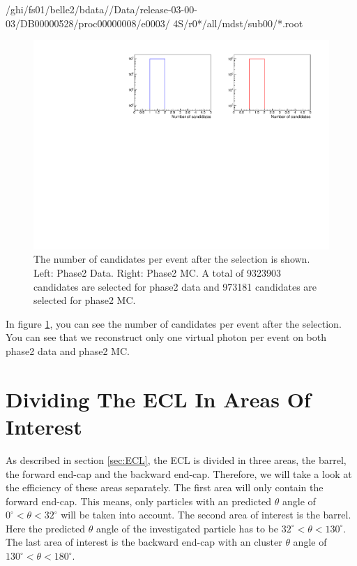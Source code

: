 \documentclass[a4paper,11pt,twosided,final,german,openbib,pdftex,listof=totoc,bibliography=totoc]{scrbook}
\begin{document}
/ghi/fs01/belle2/bdata//Data/release-03-00-03/DB00000528/proc00000008/e0003/ 4S/r0*/all/mdst/sub00/*.root
\newline



\begin{figure}[h!]
	\includegraphics[width=\textwidth]{Plots/master/CCand.pdf}
	\caption[Total Number Of Events After The Selection]{The number of candidates per event after the selection is shown. Left: Phase2 Data. Right: Phase2 MC. A total of 9323903 candidates are selected for phase2 data and 973181 candidates are selected for phase2 MC.}
	\label{fig:nCandAS}
\end{figure}


In figure \ref{fig:nCandAS}, you can see the number of candidates per event after the selection. You can see that we reconstruct only one virtual photon per event on both phase2 data and phase2 MC.


\section{Dividing The ECL In Areas Of Interest}
\label{sec:DivECL}

As described in section \ref{sec:ECL}, the ECL is divided in three areas, the barrel, the forward end-cap and the backward end-cap. Therefore, we will take a look at the efficiency of these areas separately. The first area will only contain the forward end-cap. This means, only particles with an predicted $\theta$ angle of $0^\circ <\theta<32^\circ$ will be taken into account. The second area of interest is the barrel. Here the predicted $\theta$ angle of the investigated particle has to be $32^\circ < \theta < 130^\circ$. The last area of interest is the backward end-cap with an cluster $\theta$ angle of $130^\circ <\theta < 180^\circ$.  
\end{document}
